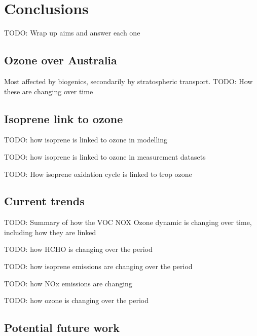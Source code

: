 \chapter{Conclusions} %
\label{Conclusions}

TODO: Wrap up aims and answer each one

\section{Ozone over Australia}
\label{Conclusions:ozone}
  
  Most affected by biogenics, secondarily by stratospheric transport.
  TODO: How these are changing over time

\section{Isoprene link to ozone}
\label{Conclusions:isoprene}

  TODO: how isoprene is linked to ozone in modelling

  TODO: how isoprene is linked to ozone in measurement datasets
  
  TODO: How isoprene oxidation cycle is linked to trop ozone
  
\section{Current trends}
\label{Conclusions:trends}

  TODO: Summary of how the VOC NOX Ozone dynamic is changing over time, including how they are linked
  
  TODO: how HCHO is changing over the period

  TODO: how isoprene emissions are changing over the period
  
  TODO: how NOx emissions are changing
  
  TODO: how ozone is changing over the period
  
\section{Potential future work}
\label{Conclusions:future}
  
